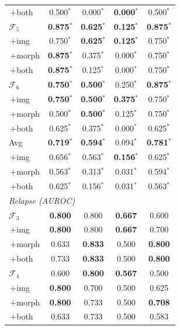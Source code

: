 \documentclass[pdflatex,sn-nature]{sn-jnl}
\begin{document}
\begin{table}[p]
\begin{tabular}{@{}l cccc@{}}
\;\,$+$both          & 0.500$^*$ & 0.000$^*$ & \textbf{0.000$^*$} & 0.500$^*$ \\
\addlinespace[0.3pt]
$\mathcal{F}_5$      & \textbf{0.875$^*$} & \textbf{0.625$^*$} & \textbf{0.125$^*$} & \textbf{0.875$^*$} \\
\;\,$+$img           & 0.750$^*$ & \textbf{0.625$^*$} & \textbf{0.125$^*$} & 0.750$^*$ \\
\;\,$+$morph         & \textbf{0.875$^*$} & 0.375$^*$ & 0.000$^*$ & 0.750$^*$ \\
\;\,$+$both          & \textbf{0.875$^*$} & 0.125$^*$ & 0.000$^*$ & 0.750$^*$ \\
\addlinespace[0.3pt]
$\mathcal{F}_6$      & \textbf{0.750$^*$} & \textbf{0.500$^*$} & 0.250$^*$ & \textbf{0.875$^*$} \\
\;\,$+$img           & \textbf{0.750$^*$} & \textbf{0.500$^*$} & \textbf{0.375$^*$} & 0.750$^*$ \\
\;\,$+$morph         & 0.500$^*$ & \textbf{0.500$^*$} & 0.125$^*$ & 0.750$^*$ \\
\;\,$+$both          & 0.625$^*$ & 0.375$^*$ & 0.000$^*$ & 0.625$^*$ \\
\addlinespace[2pt]
Avg & \textbf{0.719$^*$} & \textbf{0.594$^*$} & 0.094$^*$ & \textbf{0.781$^*$} \\
\;\,$+$img & 0.656$^*$ & 0.563$^*$ & \textbf{0.156$^*$} & 0.625$^*$ \\
\;\,$+$morph & 0.563$^*$ & 0.313$^*$ & 0.031$^*$ & 0.594$^*$ \\
\;\,$+$both & 0.625$^*$ & 0.156$^*$ & 0.031$^*$ & 0.563$^*$ \\
\midrule
\multicolumn{5}{l}{\textit{Relapse (AUROC)}} \\
$\mathcal{F}_3$      & \textbf{0.800} & 0.800 & \textbf{0.667} & 0.600 \\
\;\,$+$img           & \textbf{0.800} & 0.800 & \textbf{0.667} & 0.700 \\
\;\,$+$morph         & 0.633 & \textbf{0.833} & 0.500 & \textbf{0.800} \\
\;\,$+$both          & 0.733 & \textbf{0.833} & 0.500 & \textbf{0.800} \\
\addlinespace[0.3pt]
$\mathcal{F}_4$      & 0.600 & \textbf{0.800} & \textbf{0.567} & 0.500 \\
\;\,$+$img           & \textbf{0.800} & 0.700 & 0.500 & 0.625 \\
\;\,$+$morph         & \textbf{0.800} & 0.733 & 0.500 & \textbf{0.708} \\
\;\,$+$both          & 0.633 & 0.733 & 0.500 & 0.583 \\

\end{tabular}
\end{table}
\end{document}
